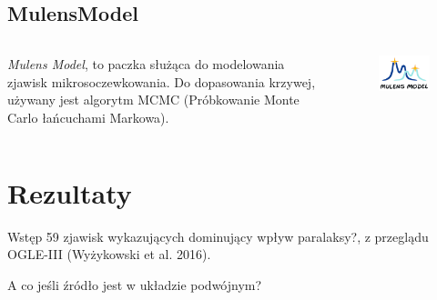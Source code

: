 \documentclass{beamer}
\begin{document}
\subsection{MulensModel}
\begin{frame}
    \begin{columns}
        \begin{column}{0.5\linewidth}
            \emph{Mulens Model}, to paczka służąca do modelowania zjawisk mikrosoczewkowania.
            Do dopasowania krzywej, używany jest algorytm MCMC (Próbkowanie Monte Carlo łańcuchami Markowa).

        \end{column}

        \begin{column}{0.5\linewidth}
            \begin{figure}
                \includegraphics[width = \textwidth]{logoMM_crop_4_372x260.png}
            \end{figure}
        \end{column}
    \end{columns}
\end{frame}

\section{Rezultaty}

\begin{frame}{Wstęp}
    59 zjawisk wykazujących dominujący wpływ paralaksy?, z przeglądu OGLE-III (Wyżykowski et al. 2016).

    \bigskip
    \bigskip

    A co jeśli źródło jest w układzie podwójnym?
\end{frame}
\end{document}
